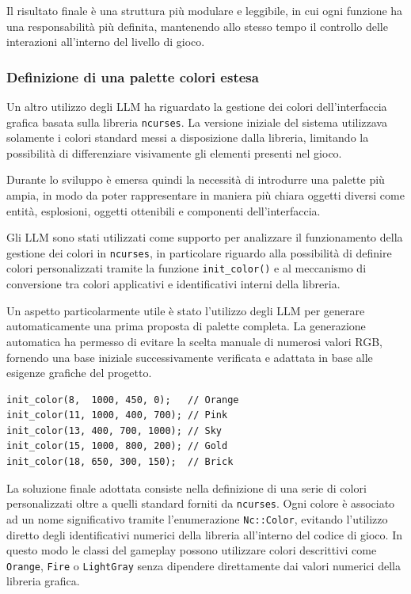 \documentclass[a4paper,11pt]{article}
\begin{document}
Il risultato finale è una struttura più modulare e leggibile, in cui ogni funzione ha una responsabilità più definita, mantenendo allo stesso tempo il controllo delle interazioni all'interno del livello di gioco.


\subsubsection{Definizione di una palette colori estesa}

Un altro utilizzo degli LLM ha riguardato la gestione dei colori dell'interfaccia grafica basata sulla libreria \texttt{ncurses}. 
La versione iniziale del sistema utilizzava solamente i colori standard messi a disposizione dalla libreria, limitando la possibilità di differenziare visivamente gli elementi presenti nel gioco.

Durante lo sviluppo è emersa quindi la necessità di introdurre una palette più ampia, in modo da poter rappresentare in maniera più chiara oggetti diversi come entità, esplosioni, oggetti ottenibili e componenti dell'interfaccia.

Gli LLM sono stati utilizzati come supporto per analizzare il funzionamento della gestione dei colori in \texttt{ncurses}, in particolare riguardo alla possibilità di definire colori personalizzati tramite la funzione \texttt{init\_color()} e al meccanismo di conversione tra colori applicativi e identificativi interni della libreria.

Un aspetto particolarmente utile è stato l'utilizzo degli LLM per generare automaticamente una prima proposta di palette completa. 
La generazione automatica ha permesso di evitare la scelta manuale di numerosi valori RGB, fornendo una base iniziale successivamente verificata e adattata in base alle esigenze grafiche del progetto.

\begin{verbatim}
init_color(8,  1000, 450, 0);   // Orange
init_color(11, 1000, 400, 700); // Pink
init_color(13, 400, 700, 1000); // Sky
init_color(15, 1000, 800, 200); // Gold
init_color(18, 650, 300, 150);  // Brick
\end{verbatim}

La soluzione finale adottata consiste nella definizione di una serie di colori personalizzati oltre a quelli standard forniti da \texttt{ncurses}. 
Ogni colore è associato ad un nome significativo tramite l'enumerazione \texttt{Nc::Color}, evitando l'utilizzo diretto degli identificativi numerici della libreria all'interno del codice di gioco.
In questo modo le classi del gameplay possono utilizzare colori descrittivi come \texttt{Orange}, \texttt{Fire} o \texttt{LightGray} senza dipendere direttamente dai valori numerici della libreria grafica.
\end{document}
